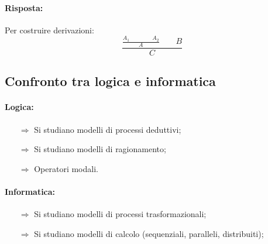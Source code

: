 \paragraph{Risposta:} Per costruire derivazioni: $$\frac{\frac{
    A_1 \:\:\:\:\:\:\:\:\:\:\:\:\:\:\:\:\:\: A_2}{A}\:\:\:\:\:\:\:\:\: B}{C}$$


\subsection{Confronto tra logica e informatica}

\paragraph{Logica:}

\begin{itemize}
    \item [$\Rightarrow$] Si studiano modelli di processi deduttivi;
    \item [$\Rightarrow$] Si studiano modelli di ragionamento;
    \item [$\Rightarrow$] Operatori modali.
\end{itemize}

\paragraph{Informatica:}

\begin{itemize}
    \item [$\Rightarrow$] Si studiano modelli di processi trasformazionali;
    \item [$\Rightarrow$] Si studiano modelli di calcolo (sequenziali, paralleli, distribuiti);
\end{itemize}